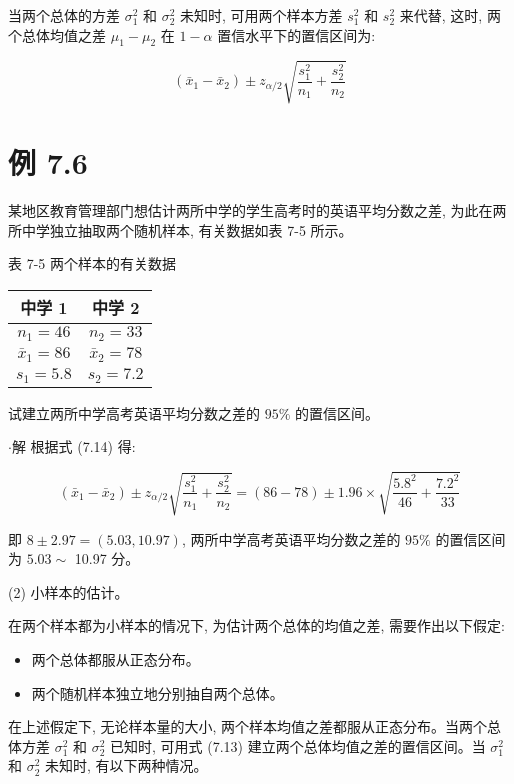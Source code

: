 \documentclass[10pt]{article}
\begin{document}
\begin{CJK*}{UTF8}{bsmi}
当两个总体的方差 $\sigma_{1}^{2}$ 和 $\sigma_{2}^{2}$ 未知时, 可用两个样本方差 $s_{1}^{2}$ 和 $s_{2}^{2}$ 来代替, 这时, 两个总体均值之差 $\mu_{1}-\mu_{2}$ 在 $1-\alpha$ 置信水平下的置信区间为:


\begin{equation*}
\left(\bar{x}_{1}-\bar{x}_{2}\right) \pm z_{\alpha / 2} \sqrt{\frac{s_{1}^{2}}{n_{1}}+\frac{s_{2}^{2}}{n_{2}}} \tag{7.14}
\end{equation*}


\section*{例 7.6}
某地区教育管理部门想估计两所中学的学生高考时的英语平均分数之差, 为此在两所中学独立抽取两个随机样本, 有关数据如表 7-5 所示。

表 7-5 两个样本的有关数据

\begin{center}
\begin{tabular}{cc}
\hline
中学 1 & 中学 2 \\
\hline
$n_{1}=46$ & $n_{2}=33$ \\
$\bar{x}_{1}=86$ & $\bar{x}_{2}=78$ \\
$s_{1}=5.8$ & $s_{2}=7.2$ \\
\hline
\end{tabular}
\end{center}

试建立两所中学高考英语平均分数之差的 $95 \%$ 的置信区间。

$\cdot$解 根据式 (7.14) 得:

$$
\left(\bar{x}_{1}-\bar{x}_{2}\right) \pm z_{\alpha / 2} \sqrt{\frac{s_{1}^{2}}{n_{1}}+\frac{s_{2}^{2}}{n_{2}}}=(86-78) \pm 1.96 \times \sqrt{\frac{5.8^{2}}{46}+\frac{7.2^{2}}{33}}
$$

即 $8 \pm 2.97=(5.03,10.97)$, 两所中学高考英语平均分数之差的 $95 \%$ 的置信区间为 $5.03 \sim$ 10.97 分。

(2) 小样本的估计。

在两个样本都为小样本的情况下, 为估计两个总体的均值之差, 需要作出以下假定:

\begin{itemize}
  \item 两个总体都服从正态分布。
  \item 两个随机样本独立地分别抽自两个总体。
\end{itemize}

在上述假定下, 无论样本量的大小, 两个样本均值之差都服从正态分布。当两个总体方差 $\sigma_{1}^{2}$ 和 $\sigma_{2}^{2}$ 已知时, 可用式 (7.13) 建立两个总体均值之差的置信区间。当 $\sigma_{1}^{2}$ 和 $\sigma_{2}^{2}$ 未知时, 有以下两种情况。


\end{CJK*}
\end{document}
